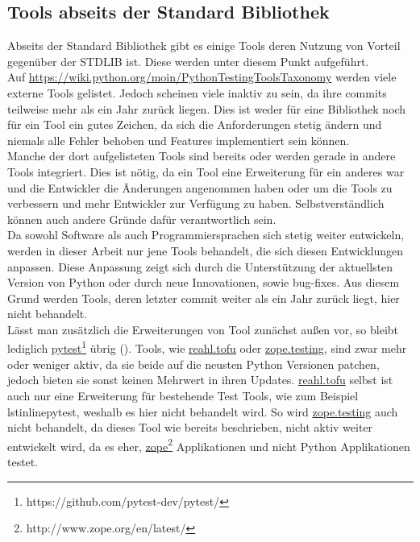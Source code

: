 \subsection{Tools abseits der Standard Bibliothek}\label{python-tools:extlib}
Abseits der Standard Bibliothek gibt es einige Tools deren Nutzung von
Vorteil gegenüber der STDLIB ist. Diese werden unter diesem Punkt aufgeführt.
\newline
\\
Auf \url{https://wiki.python.org/moin/PythonTestingToolsTaxonomy} werden viele
externe Tools gelistet. Jedoch scheinen viele inaktiv zu sein, da ihre
\glspl{commit} teilweise mehr als ein Jahr zurück liegen. Dies ist weder für
eine Bibliothek noch für ein Tool ein gutes Zeichen, da sich die Anforderungen
stetig ändern und niemals alle Fehler behoben und Features implementiert sein
können.
\newline
\\
Manche der dort aufgelisteten Tools sind bereits oder werden gerade in andere
Tools integriert. Dies ist nötig, da ein Tool eine Erweiterung für ein anderes
war und die Entwickler die Änderungen angenommen haben oder um die Tools zu
verbessern und mehr Entwickler zur Verfügung zu haben. Selbstverständlich
können auch andere Gründe dafür verantwortlich sein.
\newline
\\
Da sowohl Software als auch Programmiersprachen sich stetig weiter entwickeln,
werden in dieser Arbeit nur jene Tools behandelt, die sich diesen Entwicklungen
anpassen. Diese Anpassung zeigt sich durch die Unterstützung der aktuellsten
Version von Python oder durch neue Innovationen, sowie \Gls{bug}-fixes. Aus
diesem Grund werden Tools, deren letzter \Gls{commit} weiter als ein Jahr
zurück liegt, hier nicht behandelt.
\newline
\\
Lässt man zusätzlich die Erweiterungen von Tool zunächst außen vor, so bleibt
lediglich
\href{https://github.com/pytest-dev/pytest/}{pytest}\footnote{https://github.com/pytest-dev/pytest/}
übrig (\cite{wiki.python:PythonTestingToolsTaxonomy}).
Tools, wie
\href{https://www.reahl.org/docs/4.0/devtools/tofu.d.html}{reahl.tofu}
oder
\href{https://pypi.org/project/zope.testing/}{zope.testing},
sind zwar mehr oder weniger aktiv, da sie beide auf die neusten Python
Versionen patchen, jedoch bieten sie sonst keinen Mehrwert in ihren Updates.
\href{https://www.reahl.org/docs/4.0/devtools/tofu.d.html}{reahl.tofu}
selbst ist auch nur eine Erweiterung für bestehende Test Tools, wie zum
Beispiel lstinline{pytest}, weshalb es hier nicht behandelt wird. So wird
\href{https://pypi.org/project/zope.testing/}{zope.testing}
auch nicht behandelt, da dieses Tool wie bereits beschrieben, nicht aktiv weiter
entwickelt wird, da es eher,
\href{http://www.zope.org/en/latest/}{zope}\footnote{http://www.zope.org/en/latest/}
Applikationen und nicht Python Applikationen testet.


